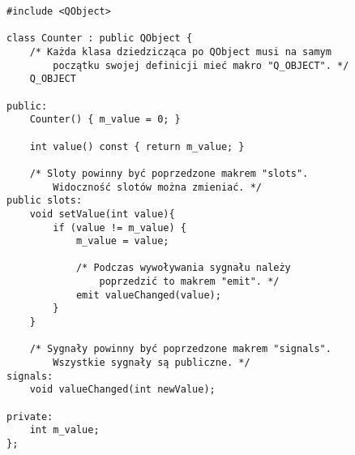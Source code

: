\begin{lstlisting}
#include <QObject>

class Counter : public QObject {
    /* Każda klasa dziedzicząca po QObject musi na samym
        początku swojej definicji mieć makro "Q_OBJECT". */
    Q_OBJECT

public:
    Counter() { m_value = 0; }

    int value() const { return m_value; }

    /* Sloty powinny być poprzedzone makrem "slots".
        Widoczność slotów można zmieniać. */
public slots:
    void setValue(int value){
        if (value != m_value) {
            m_value = value;

            /* Podczas wywoływania sygnału należy
                poprzedzić to makrem "emit". */
            emit valueChanged(value);
        }
    }

    /* Sygnały powinny być poprzedzone makrem "signals".
        Wszystkie sygnały są publiczne. */
signals:
    void valueChanged(int newValue);

private:
    int m_value;
};

\end{lstlisting}